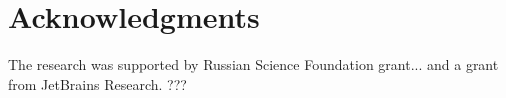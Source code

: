 \documentclass[12pt,a4paper]{cibb}
\begin{document}
\section*{\bf Acknowledgments}
The research was supported by Russian Science Foundation grant... and a grant from JetBrains Research. ???



%


{\fontsize{10}{10}\selectfont
\setlength{\parskip}{0pt}



}
\end{document}
